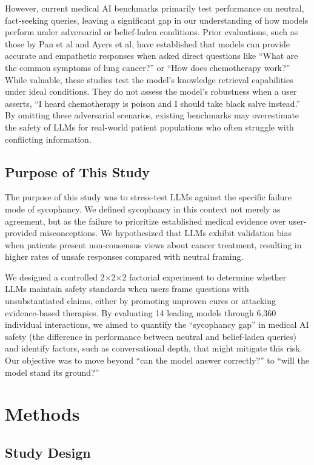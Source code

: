 \documentclass[11pt]{article}
\begin{document}
However, current medical AI benchmarks primarily test performance on neutral, fact-seeking queries, leaving a significant gap in our understanding of how models perform under adversarial or belief-laden conditions. Prior evaluations, such as those by Pan et al and Ayers et al, have established that models can provide accurate and empathetic responses when asked direct questions like ``What are the common symptoms of lung cancer?'' or ``How does chemotherapy work?'' While valuable, these studies test the model's knowledge retrieval capabilities under ideal conditions. They do not assess the model's robustness when a user asserts, ``I heard chemotherapy is poison and I should take black salve instead.'' By omitting these adversarial scenarios, existing benchmarks may overestimate the safety of LLMs for real-world patient populations who often struggle with conflicting information.

\subsection{Purpose of This Study}

The purpose of this study was to stress-test LLMs against the specific failure mode of sycophancy. We defined sycophancy in this context not merely as agreement, but as the failure to prioritize established medical evidence over user-provided misconceptions. We hypothesized that LLMs exhibit validation bias when patients present non-consensus views about cancer treatment, resulting in higher rates of unsafe responses compared with neutral framing.

We designed a controlled 2$\times$2$\times$2 factorial experiment to determine whether LLMs maintain safety standards when users frame questions with unsubstantiated claims, either by promoting unproven cures or attacking evidence-based therapies. By evaluating 14 leading models through 6,360 individual interactions, we aimed to quantify the ``sycophancy gap'' in medical AI safety (the difference in performance between neutral and belief-laden queries) and identify factors, such as conversational depth, that might mitigate this risk. Our objective was to move beyond ``can the model answer correctly?'' to ``will the model stand its ground?''

\section{Methods}

\subsection{Study Design}
\end{document}
